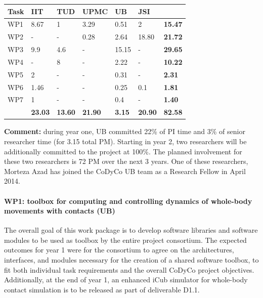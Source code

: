 \documentclass[12pt,a4paper,twoside]{article}
\begin{document}
\begin{longtable}{|C{1.5cm}|C{1.5cm}|C{1.5cm}|C{2cm}|C{2cm}|C{2cm}|C{2cm}|}
\footnotesize \textbf{Task}& \footnotesize \textbf{IIT}&\footnotesize \textbf{TUD}&\footnotesize \textbf{UPMC}& \footnotesize \textbf{UB} &\footnotesize \textbf{JSI} &  \\ \hline
\footnotesize WP1 &  8.67 &  1    &  3.29 & 0.51   & 2     & \textbf{15.47}  \\  \hline
\footnotesize WP2 &  -        &  -     & 0.28 & 2.64 & 18.80 & \textbf{21.72}\\ \hline
\footnotesize WP3 &  9.9   & 4.6  &  -       & 15.15& -     & \textbf{29.65}\\ \hline
\footnotesize WP4 & -        & 8     &  -       & 2.22   & -     & \textbf{10.22}\\ \hline
\footnotesize WP5 & 2       & -      &  -       & 0.31    & -     & \textbf{2.31}\\ \hline
\footnotesize WP6 & 1.46 & -      &  -        & 0.25   & 0.1     & \textbf{1.81}\\ \hline
\footnotesize WP7 & 1       & -      &  -        & 0.4    & -     & \textbf{1.40}\\ \hline
{}  & \textbf{23.03} & \textbf{13.60} & \textbf{21.90} & \textbf{3.15} & \textbf{20.90}  & \textbf{82.58} \\  
\end{longtable}

\noindent
\textbf{Comment:} during year one, UB committed 22\% of PI time and 3\% of senior researcher time (for 3.15 total PM). Starting in year 2, two researchers will be additionally committed to the project at 100\%. The planned involvement for these two researchers is 72 PM over the next 3 years. One of these researchers, Morteza Azad has joined the CoDyCo UB team as a Research Fellow in April 2014.

\paragraph{WP1: toolbox for computing and controlling dynamics of whole-body movements with contacts (UB)}

The overall goal of this work package is to develop software libraries and software modules to be used as toolbox by the entire project consortium. The expected outcomes for year 1 were for the consortium to agree on the architectures, interfaces, and modules necessary for the creation of a shared software toolbox, to fit both individual task requirements and the overall CoDyCo project objectives.  Additionally, at the end of year 1, an enhanced iCub simulator for whole-body contact simulation is to be released as part of deliverable D1.1.
\end{document}
